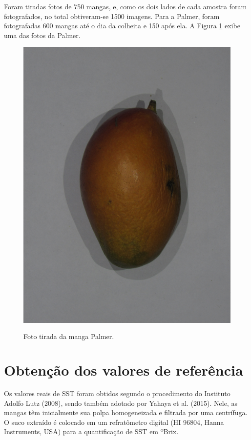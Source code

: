 Foram tiradas fotos de 750 mangas, e, como os dois lados de cada amostra foram fotografados, no total obtiveram-se 1500 imagens. Para a Palmer, foram fotografadas 600 mangas até o dia da colheita e 150 após ela. A Figura \ref{img:palmer_tommy} exibe uma das fotos da Palmer.

\begin{figure}[H]
\centering
    \caption{\label{img:palmer_tommy} Foto tirada da manga Palmer.}
    {\includegraphics[scale=0.16]{img/palmer}}
\end{figure}

\section{Obtenção dos valores de referência}

Os valores reais de SST foram obtidos segundo o procedimento do Instituto Adolfo Lutz (2008), sendo também adotado por Yahaya et al. (2015). Nele, as mangas têm inicialmente sua polpa homogeneizada e filtrada por uma centrífuga. O suco extraído é colocado em um refratômetro digital (HI 96804, Hanna Instruments, USA) para a quantificação de SST em ºBrix.

